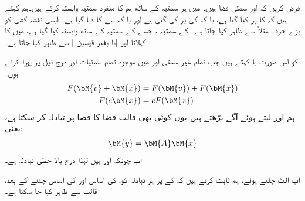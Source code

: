 فرض کریں کہ  اور  سمتی فضا ہیں۔ میں ہر سمتیہ  کے ساتھ ہم  کا منفرد سمتیہ  وابستہ کرتے ہیں۔ہم کہتے ہیں کہ  کا  پر  کیا گیا ہے، یا کہ  کی  پر    کی گئی ہے  اور یا کہ  سے  کا  دیا گیا ہے۔ ایسی نقشہ کشی کو بڑے حرف مثلاً  سے ظاہر کیا جاتا ہے۔ کے سمتیہ ، جسے  کے سمتیہ  کے ساتھ وابستہ کیا گیا ہے،  میں  کا  کہلاتا اور  [یا  بغیر قوسین ] سے ظاہر کیا جاتا ہے۔ 

کو  اس صورت   یا  کہتے  ہیں جب تمام غیر سمتی  اور  میں موجود تمام سمتیات  اور  درج ذیل پر پورا اترتے ہوں۔
\begin{gather}
\begin{aligned}\label{مساوات_الجبرا_خطی_نظام_تعریف}
F(\bM{v}+\bM{x})&=F(\bM{v})+F(\bM{x})\\
F(c\bM{x})&=cF(\bM{x})
\end{aligned}
\end{gather} 
ہم  اور  لیتے ہوئے آگے بڑھتے ہیں۔یوں کوئی بھی  قالب  فضا  کا فضا  پر تبادلہ کر سکتا ہے، یعنی:
\begin{align}\label{مساوات_الجبرا_تبادلہ_خطی_فضا_الف}
\bM{y}=\bM{A}\bM{x}
\end{align}
اب چونکہ  اور  ہیں لہٰذا درج بالا خطی تبادلہ ہے۔

اب الٹ چلتے ہوئے، ہم ثابت کرتے ہیں کہ  کے  پر ہر تبادلہ  کو،  کی اساس اور  کی اساس چننے کے بعد،   قالب  سے ظاہر کیا جا سکتا ہے۔

